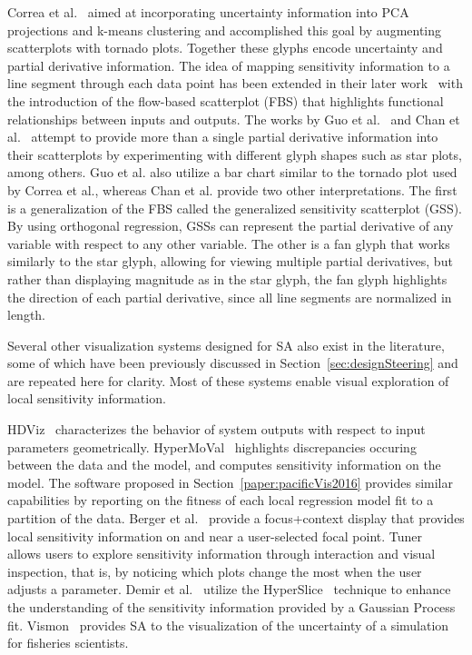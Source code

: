 Correa et al.~\cite{CorreaChanMa2009} aimed at incorporating uncertainty information into PCA projections and k-means clustering and accomplished this goal by augmenting scatterplots with tornado plots.
%
Together these glyphs encode uncertainty and partial derivative information.
%
The idea of mapping sensitivity information to a line segment through each data point has been extended in their later work~\cite{ChanCorreaMa2010} with the introduction of the flow-based scatterplot (FBS) that highlights functional relationships between inputs and outputs.
%
The works by Guo et al.~\cite{GuoWardRundensteiner2011} and Chan et al.~\cite{ChanCorreaMa2013} attempt to provide more than a single partial derivative information into their scatterplots by experimenting with different glyph shapes such as star plots, among others.
%
Guo et al. also utilize a bar chart similar to the tornado plot used by Correa et al., whereas Chan et al. provide two other interpretations.
%
The first is a generalization of the FBS called the generalized sensitivity scatterplot (GSS).
%
By using orthogonal regression, GSSs can represent the partial derivative of any variable with respect to any other variable.
%
The other is a fan glyph that works similarly to the star glyph, allowing for viewing multiple partial derivatives, but rather than displaying magnitude as in the star glyph, the fan glyph highlights the direction of each partial derivative, since all line segments are normalized in length.

Several other visualization systems designed for SA also exist in the literature, some of which have been previously discussed in Section~\ref{sec:designSteering} and are repeated here for clarity.
%
Most of these systems enable visual exploration of local sensitivity information.

HDViz~\cite{GerberBremerPascucci2010} characterizes the behavior of system outputs with respect to input parameters geometrically.
%
HyperMoVal~\cite{PiringerBergerKrasser2010} highlights discrepancies occuring between the data and the model, and computes sensitivity information on the model.
%
The software proposed in Section~\ref{paper:pacificVis2016} provides similar capabilities by reporting on the fitness of each local regression model fit to a partition of the data.
%
Berger et al.~\cite{BergerPiringerFilzmoser2011} provide a focus+context display that provides local sensitivity information on and near a user-selected focal point.
%
Tuner~\cite{Torsney-WeirSaadMoller2011} allows users to explore sensitivity information through interaction and visual inspection, that is, by noticing which plots change the most when the user adjusts a parameter.
%
Demir et al.~\cite{DemirWestermann2013} utilize the HyperSlice~\cite{VanWijkVanLiere1993} technique to enhance the understanding of the sensitivity information provided by a Gaussian Process fit.
%
Vismon~\cite{BooshehrianMullrPeterman2012} provides SA to the visualization of the uncertainty of a simulation for fisheries scientists.

